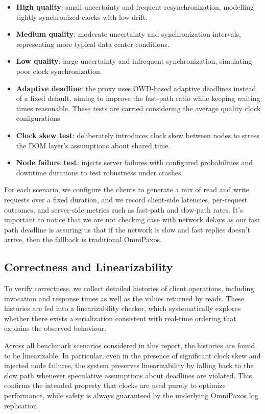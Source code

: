 \documentclass{article}
\begin{document}
\begin{itemize}
  \item \textbf{High quality}: small uncertainty and frequent resynchronization, modelling tightly synchronized clocks with low drift.
  \item \textbf{Medium quality}: moderate uncertainty and synchronization intervals, representing more typical data center conditions.
  \item \textbf{Low quality}: large uncertainty and infrequent synchronization, simulating poor clock synchronization.
  \item \textbf{Adaptive deadline}: the proxy uses OWD-based adaptive deadlines instead of a fixed default, aiming to improve the fast-path ratio while keeping waiting times reasonable. These tests are carried considering the average quality clock configurations 
  \item \textbf{Clock skew test}: deliberately introduces clock skew between nodes to stress the DOM layer's assumptions about shared time.
  \item \textbf{Node failure test}: injects server failures with configured probabilities and downtime durations to test robustness under crashes.
\end{itemize}

For each scenario, we configure the clients to generate a mix of read and write requests over a fixed duration, and we record client-side latencies, per-request outcomes, and server-side metrics such as fast-path and slow-path rates.
It's important to notice that we are not checking case with network delays as our fast path deadline is assuring us that if the network is slow and fast replies
doesn't arrive, then the fallback is traditional OmniPaxos.

\subsection{Correctness and Linearizability}
To verify correctness, we collect detailed histories of client operations, including invocation and response times as well as the values returned by reads. These histories are fed into a linearizability checker, which systematically explores whether there exists a serialization consistent with real-time ordering that explains the observed behaviour.

Across all benchmark scenarios considered in this report, the histories are found to be linearizable. In particular, even in the presence of significant clock skew and injected node failures, the system preserves linearizability by falling back to the slow path whenever speculative assumptions about deadlines are violated. This confirms the intended property that clocks are used purely to optimize performance, while safety is always guaranteed by the underlying OmniPaxos log replication.
\end{document}
